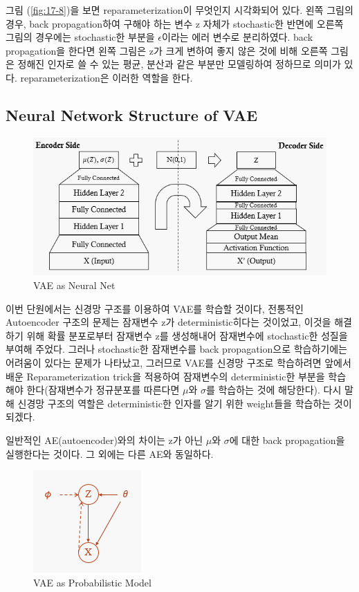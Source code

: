 \documentclass[draft=false]{oblivoir}
\begin{document}
그림 (\ref{fig:17-8})을 보면 reparameterization이 무엇인지 시각화되어 있다. 왼쪽 그림의 경우, back propagation하여 구해야 하는 변수 z 자체가 stochastic한 반면에 오른쪽 그림의 경우에는 stochastic한 부분을 $\epsilon$이라는 에러 변수로 분리하였다. back propagation을 한다면 왼쪽 그림은 z가 크게 변하여 좋지 않은 것에 비해 오른쪽 그림은 정해진 인자로 쓸 수 있는 평균, 분산과 같은 부분만 모델링하여 정하므로 의미가 있다. reparameterization은 이러한 역할을 한다.

\subsection{Neural Network Structure of VAE}

\begin{figure}[ht] \centering
  \includegraphics[scale=1.1]{fig9.png}
  \caption{VAE as Neural Net}
  \label{fig:17-9}
\end{figure}

이번 단원에서는 신경망 구조를 이용하여 VAE를 학습할 것이다, 전통적인 Autoencoder 구조의 문제는 잠재변수 z가 deterministic히다는 것이었고, 이것을 해결하기 위해 확률 분포로부터 잠재변수 z를 생성해내어 잠재변수에 stochastic한 성질을 부여해 주었다. 그러나 stochastic한 잠재변수를 back propagation으로 학습하기에는 어려움이 있다는 문제가 나타났고, 그러므로 VAE를 신경망 구조로 학습하려면 앞에서 배운 Reparameterization trick을 적용하여 잠재변수의 deterministic한 부분을 학습해야 한다(잠재변수가 정규분포를 따른다면 $\mu$와 $\sigma$를 학습하는 것에 해당한다). 다시 말해 신경망 구조의 역할은 deterministic한 인자를 알기 위한 weight들을 학습하는 것이 되겠다.

일반적인 AE(autoencoder)와의 차이는 z가 아닌 $\mu$와 $\sigma$에 대한 back propagation을 실행한다는 것이다. 그 외에는 다른 AE와 동일하다.

\begin{figure}[ht] \centering
  \includegraphics[scale=1.8]{fig10.png}
  \caption{VAE as Probabilistic Model}
  \label{fig:17-10}
\end{figure}
\end{document}

